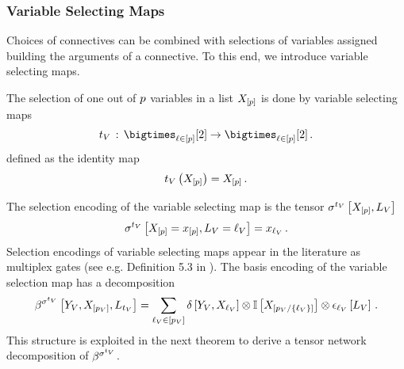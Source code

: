 \subsubsection{Variable Selecting Maps}

Choices of connectives can be combined with selections of variables assigned building the arguments of a connective.
To this end, we introduce variable selecting maps.

\begin{definition}
    \label{def:variableSelector}
    The selection of one out of $p$ variables in a list $X_{[p]}$ is done by variable selecting maps
    \begin{align}
        \vselectionmap\defcols \bigtimes_{\selindex\in[\seldim]}[2] \rightarrow \bigtimes_{\selindex\in[\seldim]}[2] \, .
    \end{align}
    defined as the identity map
    \begin{align*}
        t_{V}\left(X_{[p]}\right) = X_{[p]} \, .
    \end{align*}
\end{definition}

The selection encoding of the variable selecting map is the tensor $\sigma^{t_{V}}\left[X_{[p]},L_{V}\right]$
\begin{align*}
    \sigma^{t_{V}}\left[X_{[p]}=x_{[p]},L_{V}=\ell_{V}\right] = x_{\ell_{V}} \, .
\end{align*}
Selection encodings of variable selecting maps appear in the literature as multiplex gates (see e.g. Definition 5.3 in \cite{koller_probabilistic_2009}).
The basis encoding of the variable selection map has a decomposition
\begin{align*}
    \bsencodingofat{\vselectionmap}{\vselectionheadvar,\catvariableof{[\seldimof{\vselectionsymbol}]},\selvariableof{\vselectionmap}}
    = \sum_{\selindexofin{\vselectionsymbol}}
    \identityat{\vselectionheadvar,\catvariableof{\selindexof{\vselectionsymbol}}}
    \otimes \onesat{\catvariableof{[\seldimof{\vselectionsymbol}/\{\selindexof{\vselectionsymbol}\}]}}
    \otimes \onehotmapofat{\selindexof{\vselectionsymbol}}{\selvariableof{\vselectionsymbol}} \, .
\end{align*}
This structure is exploited in the next theorem to derive a tensor network decomposition of $\beta^{\sigma^{t_{V}}}$.

